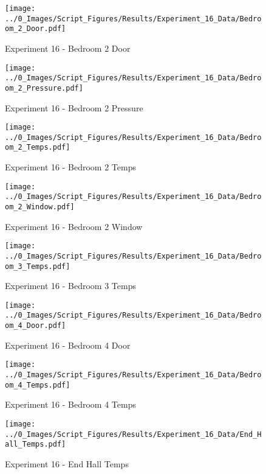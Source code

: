 	\begin{figure}[H]
		\centering
		\texttt{[image: ../0\_Images/Script\_Figures/Results/Experiment\_16\_Data/Bedroom\_2\_Door.pdf]}
		\caption[]{Experiment 16 - Bedroom 2 Door}
	\end{figure}
 
	\clearpage

	\begin{figure}[H]
		\centering
		\texttt{[image: ../0\_Images/Script\_Figures/Results/Experiment\_16\_Data/Bedroom\_2\_Pressure.pdf]}
		\caption[]{Experiment 16 - Bedroom 2 Pressure}
	\end{figure}
 

	\begin{figure}[H]
		\centering
		\texttt{[image: ../0\_Images/Script\_Figures/Results/Experiment\_16\_Data/Bedroom\_2\_Temps.pdf]}
		\caption[]{Experiment 16 - Bedroom 2 Temps}
	\end{figure}
 
	\clearpage

	\begin{figure}[H]
		\centering
		\texttt{[image: ../0\_Images/Script\_Figures/Results/Experiment\_16\_Data/Bedroom\_2\_Window.pdf]}
		\caption[]{Experiment 16 - Bedroom 2 Window}
	\end{figure}
 

	\begin{figure}[H]
		\centering
		\texttt{[image: ../0\_Images/Script\_Figures/Results/Experiment\_16\_Data/Bedroom\_3\_Temps.pdf]}
		\caption[]{Experiment 16 - Bedroom 3 Temps}
	\end{figure}
 
	\clearpage

	\begin{figure}[H]
		\centering
		\texttt{[image: ../0\_Images/Script\_Figures/Results/Experiment\_16\_Data/Bedroom\_4\_Door.pdf]}
		\caption[]{Experiment 16 - Bedroom 4 Door}
	\end{figure}
 

	\begin{figure}[H]
		\centering
		\texttt{[image: ../0\_Images/Script\_Figures/Results/Experiment\_16\_Data/Bedroom\_4\_Temps.pdf]}
		\caption[]{Experiment 16 - Bedroom 4 Temps}
	\end{figure}
 
	\clearpage

	\begin{figure}[H]
		\centering
		\texttt{[image: ../0\_Images/Script\_Figures/Results/Experiment\_16\_Data/End\_Hall\_Temps.pdf]}
		\caption[]{Experiment 16 - End Hall Temps}
	\end{figure}
 

